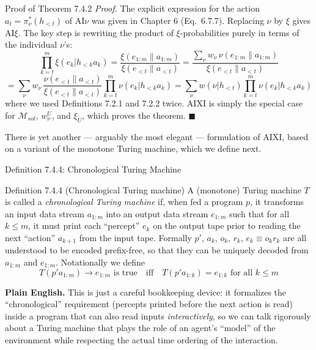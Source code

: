 \documentclass[aspectratio=169,10pt]{beamer}
\newcommand{\Msol}{\mathcal{M}_{sol}}
\begin{document}
\begin{frame}{Proof of Theorem 7.4.2}
  \textit{Proof.} The explicit expression for the action
  $a_t=\pi_\nu^*(h_{<t})$ of AI$\nu$ was given in Chapter 6 (Eq.\ 6.7.7).
  Replacing $\nu$ by $\xi$ gives AI$\xi$. The key step is rewriting the
  product of $\xi$-probabilities purely in terms of the individual $\nu$'s:
  \[
    \prod_{k=t}^m\xi(e_k|h_{<k}a_k)
    = \frac{\xi(e_{1:m}\|a_{1:m})}{\xi(e_{<t}\|a_{<t})}
    = \frac{\sum_\nu w_\nu\,\nu(e_{1:m}\|a_{1:m})}{\xi(e_{<t}\|a_{<t})}
  \]
  \[
    = \sum_\nu w_\nu\,\frac{\nu(e_{<t}\|a_{<t})}{\xi(e_{<t}\|a_{<t})}
    \prod_{k=t}^m\nu(e_k|h_{<k}a_k)
    = \sum_\nu w(\nu|h_{<t})\prod_{k=t}^m\nu(e_k|h_{<k}a_k) \tag{7.4.3}
  \]
  where we used Definitions 7.2.1 and 7.2.2 twice. AIXI is simply the
  special case for $\Msol$, $w_\nu^U$, and $\xi_U$, which proves the
  theorem. $\blacksquare$

  \vspace{2mm}
  There is yet another --- arguably the most elegant --- formulation of
  AIXI, based on a variant of the monotone Turing machine, which we define
  next.
\end{frame}

\begin{frame}{Definition 7.4.4: Chronological Turing Machine}
  \begin{block}{Definition 7.4.4 (Chronological Turing machine)}
    A (monotone) Turing machine $T$ is called a \emph{chronological Turing
    machine} if, when fed a program $p$, it transforms an input data stream
    $a_{1:m}$ into an output data stream $e_{1:m}$ such that for all
    $k\le m$, it must print each ``percept'' $e_k$ on the output tape prior
    to reading the next ``action'' $a_{k+1}$ from the input tape. Formally
    $p'$, $a_k$, $o_k$, $r_k$, $e_k\equiv o_kr_k$ are all understood to be
    encoded prefix-free, so that they can be uniquely decoded from $a_{1:m}$
    and $e_{1:m}$. Notationally we define
    \[
      T(p'a_{1:m})\to e_{1:m} \text{ is true} \quad\text{iff}\quad
      T(p'a_{1:k}) = e_{1:k} \text{ for all } k\le m
    \]
  \end{block}
  \textbf{Plain English.} This is just a careful bookkeeping device: it
  formalizes the ``chronological'' requirement (percepts printed before the
  next action is read) inside a program that can also read inputs
  \emph{interactively}, so we can talk rigorously about a Turing machine
  that plays the role of an agent's ``model'' of the environment while
  respecting the actual time ordering of the interaction.
\end{frame}
\end{document}
